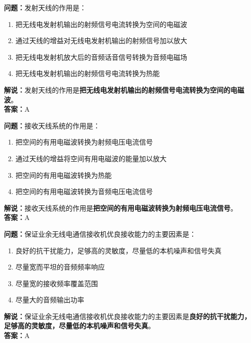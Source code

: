 \textbf{问题：}发射天线的作用是：

\begin{enumerate}[label=\Alph*), leftmargin=1.5cm]
	\item 把无线电发射机输出的射频信号电流转换为空间的电磁波
	\item 通过天线的增益对无线电发射机输出的射频信号加以放大
	\item 把无线电发射机放大后的音频话音信号转换为音频电磁场
	\item 把无线电发射机输出的射频信号电流转换为热能
\end{enumerate}

\textbf{解说：}发射天线的作用是\textbf{把无线电发射机输出的射频信号电流转换为空间的电磁波}。\\\textbf{答案：}A%



\textbf{问题：}接收天线系统的作用是：

\begin{enumerate}[label=\Alph*), leftmargin=1.5cm]
	\item 把空间的有用电磁波转换为射频电压电流信号
	\item 通过天线的增益将空间有用电磁波的能量加以放大
	\item 把空间的有用电磁波转换为热能
	\item 把空间的有用电磁波转换为音频电压电流信号
\end{enumerate}

\textbf{解说：}接收天线系统的作用是\textbf{把空间的有用电磁波转换为射频电压电流信号}。\\\textbf{答案：}A%



\textbf{问题：}保证业余无线电通信接收机优良接收能力的主要因素是：

\begin{enumerate}[label=\Alph*), leftmargin=1.5cm]
	\item 良好的抗干扰能力，足够高的灵敏度，尽量低的本机噪声和信号失真
	\item 尽量宽而平坦的音频频率响应
	\item 尽量宽的接收频率覆盖范围
	\item 尽量大的音频输出功率
\end{enumerate}

\textbf{解说：}保证业余无线电通信接收机优良接收能力的主要因素是\textbf{良好的抗干扰能力，足够高的灵敏度，尽量低的本机噪声和信号失真}。\\\textbf{答案：}A%



